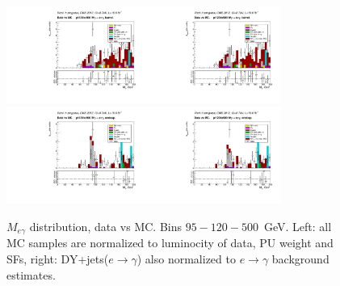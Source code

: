 \begin{figure}[htb]
\begin{center}
    \includegraphics[width=0.40\textwidth]{../figs/figs_v11/ELECTRON_WGamma/PrepareYields/c_TotalDATAvsMC_Barrel__Mpholep1PRELIMINARY_FOR_E_TO_GAMMA_WITH_PSV_CUT_pt120to500_.pdf}\includegraphics[width=0.40\textwidth]{../figs/figs_v11/ELECTRON_WGamma/PrepareYields/c_TotalDATAvsMC_Barrel__Mpholep1PRELIMINARY_FOR_E_TO_GAMMA_WITH_PSV_CUT_pt120to500__etogScale.pdf}\\
    \includegraphics[width=0.40\textwidth]{../figs/figs_v11/ELECTRON_WGamma/PrepareYields/c_TotalDATAvsMC_Endcap__Mpholep1PRELIMINARY_FOR_E_TO_GAMMA_WITH_PSV_CUT_pt120to500_.pdf}\includegraphics[width=0.40\textwidth]{../figs/figs_v11/ELECTRON_WGamma/PrepareYields/c_TotalDATAvsMC_Endcap__Mpholep1PRELIMINARY_FOR_E_TO_GAMMA_WITH_PSV_CUT_pt120to500__etogScale.pdf}\\
   \label{fig:Mpholep1DatavsMC_75to500}
  \caption{$M_{e\gamma}$ distribution, data vs MC. Bins $95-120-500$~GeV. Left: all MC samples are normalized to luminocity of data, PU weight and SFs, right: DY+jets($e\rightarrow\gamma$) also normalized to $e\rightarrow\gamma$ background estimates.}
  \end{center}
\end{figure}
